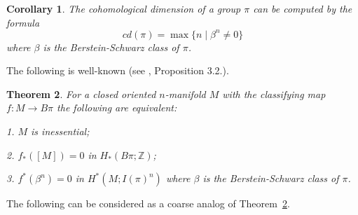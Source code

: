 \documentclass[12pt]{amsart}
\theoremstyle{plain}
\newtheorem{thm}{Theorem}[section]
\newtheorem{cor}[thm]{Corollary}
\theoremstyle{definition}
\begin{document}
\begin{cor}
The cohomological dimension of a group $\pi$ can be computed by the formula
$$
cd(\pi)=\max\{n\mid \beta^n\ne 0\}
$$
where $\beta$ is the Berstein-Schwarz class of $\pi$.
\end{cor}

The following is well-known (see \cite{BD}, Proposition 3.2.).
\begin{thm}\label{iness}
For a closed oriented $n$-manifold $M$ with the classifying map $f:M\to B\pi$ the following are equivalent:

1. $M$ is inessential;

2. $f_*([M])=0$ in $H_*(B\pi;\mathbb Z)$;

3. $f^*(\beta^n)=0$ in $H^*(M;I(\pi)^n)$ where $\beta$ is the Berstein-Schwarz class of $\pi$.
\end{thm}

The following can be considered as a coarse analog of Theorem~\ref{iness}.
\end{document}
